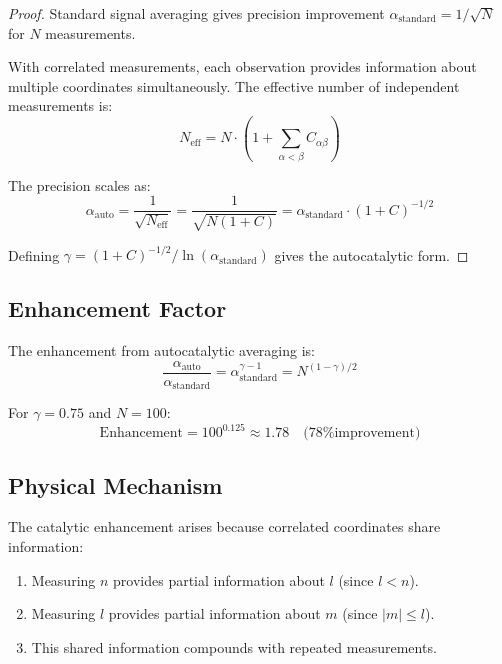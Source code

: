 \begin{proof}
Standard signal averaging gives precision improvement $\alpha_{\text{standard}} = 1/\sqrt{N}$ for $N$ measurements.

With correlated measurements, each observation provides information about multiple coordinates simultaneously. The effective number of independent measurements is:
\begin{equation}
    N_{\text{eff}} = N \cdot (1 + \sum_{\alpha < \beta} C_{\alpha\beta})
\end{equation}

The precision scales as:
\begin{equation}
    \alpha_{\text{auto}} = \frac{1}{\sqrt{N_{\text{eff}}}} = \frac{1}{\sqrt{N(1 + C)}} = \alpha_{\text{standard}} \cdot (1 + C)^{-1/2}
\end{equation}

Defining $\gamma = (1 + C)^{-1/2} / \ln(\alpha_{\text{standard}})$ gives the autocatalytic form.
\end{proof}

\subsection{Enhancement Factor}

The enhancement from autocatalytic averaging is:
\begin{equation}
    \frac{\alpha_{\text{auto}}}{\alpha_{\text{standard}}} = \alpha_{\text{standard}}^{\gamma - 1} = N^{(1-\gamma)/2}
\end{equation}

For $\gamma = 0.75$ and $N = 100$:
\begin{equation}
    \text{Enhancement} = 100^{0.125} \approx 1.78 \quad \text{(78\% improvement)}
\end{equation}

\subsection{Physical Mechanism}

The catalytic enhancement arises because correlated coordinates share information:
\begin{enumerate}
    \item Measuring $n$ provides partial information about $l$ (since $l < n$).
    \item Measuring $l$ provides partial information about $m$ (since $|m| \leq l$).
    \item This shared information compounds with repeated measurements.
\end{enumerate}

